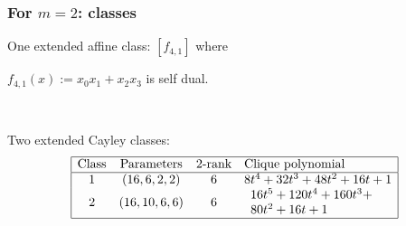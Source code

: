 \documentclass[pdf,sprung,slideColor,nocolorBG]{beamer}
\begin{document}
\begin{frame}
\frametitle{For $m=2$: classes}

One extended affine class: $[f_{4,1}]$ where 

$f_{4,1}(x) := x_0 x_1 + x_2 x_3$ is self dual.

~

Two extended Cayley classes:
\begin{align*}
\begin{array}{|cccl|}
\hline
\text{Class} &
\text{Parameters} & 
\text{2-rank} &
\text{Clique polynomial}
\\
\hline
1 &
(16, 6, 2, 2) & 
6 &
8t^{4} + 32t^{3} + 48t^{2} + 16t + 1
\\
2 &
(16, 10, 6, 6) & 
6 &
\begin{array}{l}
16t^{5} + 120t^{4} + 160t^{3} + 
\\
80t^{2} + 16t + 1
\end{array}
\\
\hline
\end{array}
\end{align*}
\end{frame}
\end{document}
